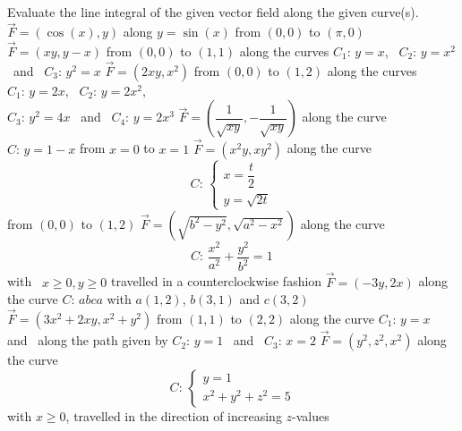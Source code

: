 \subsection*{}
\begin{Exercise} Evaluate the line integral of the given vector field along the given curve(s). 
        \Question[difficulty = 2] $\vec F = \left(\cos (x), y \right)$ \quad along $y=\sin(x)$ from $(0,0)$ to $(\pi,0)$
        \Question[difficulty = 2] $\vec F = (xy, y-x)$ \quad from $(0,0)$ to $(1,1)$ along the curves $C_1: \, y=x$, \, $C_2: \, y=x^2$ \, and \, $C_3: \, y^2=x$
        \Question[difficulty = 3] $\vec F = (2xy, x^2)$ \quad from $(0,0)$ to $(1,2)$ along the curves $C_1: \, y=2x$, \, $C_2: \, y=2x^2$, \\ $C_3: \, y^2=4x$ \, and \, $C_4: \, y=2x^3$
        \Question[difficulty = 2] $\vec F = \left(\dfrac{1}{\sqrt{xy}}, -\dfrac{1}{\sqrt{xy}} \right)$ \quad along the curve $C: \, y=1-x$ from $x=0$ to $x=1$ %
        \Question[difficulty = 1] $\vec F = (x^2y, xy^2)$ \quad along the curve $$C: \, \left\{ \begin{array}{l} x = \dfrac{t}{2} \\ y = \sqrt{2t} \end{array} \right.$$ from $(0,0)$ to $(1,2)$ 
        \Question[difficulty = 3] $\vec F = \left(\sqrt{b^2-y^2}, \sqrt{a^2-x^2} \right)$ \quad along the curve $$C: \, \dfrac{x^2}{a^2} + \dfrac{y^2}{b^2} = 1\, $$ with \, $x\geq 0, y \geq 0$ travelled  in a counterclockwise fashion
        \Question[difficulty = 3] $\vec F = (-3y, 2x)$ \quad along the curve $C: \, abca$ with $a(1,2)$, $b(3,1)$ and $c(3,2)$
        \Question[difficulty = 2] $\vec F = \left(3x^2+2xy, x^2+y^2 \right)$ \quad from $(1,1)$ to $(2,2)$ along the curve $C_1: \, y=x$  \, and \, along the path given by $C_2: \, y=1$ \, and \, $C_3: \, x=2$
        \Question[difficulty = 3] $\vec F = (y^2, z^2, x^2)$ \quad along the curve $$C: \, \left\{ \begin{array}{l} y=1  \\ x^2 + y^2 + z^2 = 5 \end{array} \right.$$ with $x \geq 0$, travelled in the direction of increasing $z$-values
\end{Exercise}

